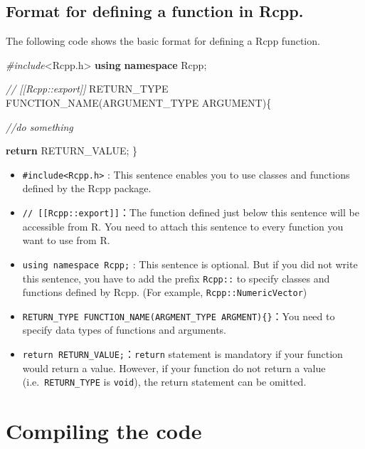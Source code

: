 \documentclass[
]{book}
\newenvironment{Shaded}{\begin{snugshade}}{\end{snugshade}}
\newcommand{\CommentTok}[1]{\textcolor[rgb]{0.56,0.35,0.01}{\textit{#1}}}
\newcommand{\ControlFlowTok}[1]{\textcolor[rgb]{0.13,0.29,0.53}{\textbf{#1}}}
\newcommand{\ImportTok}[1]{#1}
\newcommand{\KeywordTok}[1]{\textcolor[rgb]{0.13,0.29,0.53}{\textbf{#1}}}
\newcommand{\NormalTok}[1]{#1}
\newcommand{\PreprocessorTok}[1]{\textcolor[rgb]{0.56,0.35,0.01}{\textit{#1}}}
\begin{document}
\hypertarget{format-for-defining-a-function-in-rcpp.}{%
\subsection{Format for defining a function in Rcpp.}\label{format-for-defining-a-function-in-rcpp.}}

The following code shows the basic format for defining a Rcpp function.

\begin{Shaded}
\begin{Highlighting}[]
\PreprocessorTok{#include}\ImportTok{<Rcpp.h>}
\KeywordTok{using} \KeywordTok{namespace}\NormalTok{ Rcpp;}

\CommentTok{// [[Rcpp::export]]}
\NormalTok{RETURN_TYPE FUNCTION_NAME(ARGUMENT_TYPE ARGUMENT)\{}

    \CommentTok{//do something}

    \ControlFlowTok{return}\NormalTok{ RETURN_VALUE;}
\NormalTok{\}}
\end{Highlighting}
\end{Shaded}

\begin{itemize}
\item
  \texttt{\#include\textless{}Rcpp.h\textgreater{}} : This sentence enables you to use classes and functions defined by the Rcpp package.
\item
  \texttt{//\ {[}{[}Rcpp::export{]}{]}}：The function defined just below this sentence will be accessible from R. You need to attach this sentence to every function you want to use from R.
\item
  \texttt{using\ namespace\ Rcpp;} : This sentence is optional. But if you did not write this sentence, you have to add the prefix \texttt{Rcpp::} to specify classes and functions defined by Rcpp. (For example, \texttt{Rcpp::NumericVector})
\item
  \texttt{RETURN\_TYPE\ FUNCTION\_NAME(ARGMENT\_TYPE\ ARGMENT)\{\}}：You need to specify data types of functions and arguments.
\item
  \texttt{return\ RETURN\_VALUE;}：\texttt{return} statement is mandatory if your function would return a value. However, if your function do not return a value (i.e.~\texttt{RETURN\_TYPE} is \texttt{void}), the return statement can be omitted.
\end{itemize}

\hypertarget{compiling-the-code}{%
\section{Compiling the code}\label{compiling-the-code}}
\end{document}

